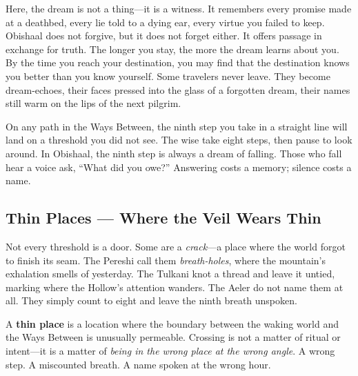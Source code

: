 Here, the dream is not a thing---it is a witness. It remembers every promise made at a deathbed, every lie told to a dying ear, every virtue you failed to keep. Obishaal does not forgive, but it does not forget either. It offers passage in exchange for truth. The longer you stay, the more the dream learns about you. By the time you reach your destination, you may find that the destination knows you better than you know yourself. Some travelers never leave. They become dream-echoes, their faces pressed into the glass of a forgotten dream, their names still warm on the lips of the next pilgrim.

\begin{tcolorbox}[colback=black!3,colframe=red!60!black,title={The Ninth Taboo Manifestation},breakable]
On any path in the Ways Between, the ninth step you take in a straight line will land on a threshold you did not see. The wise take eight steps, then pause to look around. In Obishaal, the ninth step is always a dream of falling. Those who fall hear a voice ask, ``What did you owe?'' Answering costs a memory; silence costs a name.
\end{tcolorbox}


\subsection*{Thin Places --- Where the Veil Wears Thin}

Not every threshold is a door. Some are a \emph{crack}---a place where the world forgot to finish its seam. The Pereshi call them \emph{breath-holes}, where the mountain's exhalation smells of yesterday. The Tulkani knot a thread and leave it untied, marking where the Hollow's attention wanders. The Aeler do not name them at all. They simply count to eight and leave the ninth breath unspoken.

A \textbf{thin place} is a location where the boundary between the waking world and the Ways Between is unusually permeable. Crossing is not a matter of ritual or intent---it is a matter of \emph{being in the wrong place at the wrong angle}. A wrong step. A miscounted breath. A name spoken at the wrong hour.

